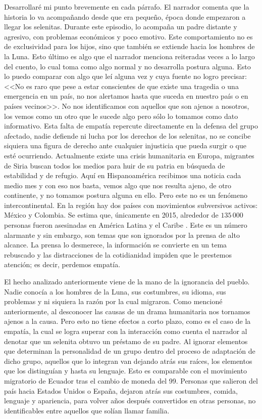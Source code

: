 \documentclass[a4paper]{tufte-handout}
\begin{document}
Desarrollaré mi punto brevemente en cada párrafo. El narrador comenta que la historia lo va acompañando desde que era pequeño, época donde empezaron a llegar los selenitas. Durante este episodio, lo acompaña un padre distante y agresivo, con problemas económicos y poco emotivo. Este comportamiento no es de exclusividad para los hijos, sino que también se extiende hacia los hombres de la Luna. Esto último es algo que el narrador menciona reiteradas veces a lo largo del cuento, lo cual toma como algo normal y no desarrolla postura alguna. Esto lo puedo comparar con algo que leí alguna vez y cuya fuente no logro precisar: <<No es raro que pese a estar conscientes de que existe una tragedia o una emergencia en un país, no nos alertamos hasta que suceda en nuestro país o en países vecinos>>. No nos identificamos con aquellos que
son ajenos a nosotros, los vemos como un otro que le sucede algo pero sólo lo tomamos como dato informativo. Esta falta de empatía repercute directamente en la defensa del grupo afectado, nadie defiende ni lucha por los derechos de los selenitas, no se concibe siquiera una figura de derecho ante cualquier injusticia que pueda surgir o que esté ocurriendo. Actualmente existe una crisis humanitaria en Europa, migrantes de Siria buscan todos los medios para huir de su patria en búsqueda de estabilidad y de refugio. Aquí en Hispanoamérica recibimos una noticia cada medio mes y con eso nos basta, vemos algo que nos resulta ajeno, de otro continente, y no tomamos postura alguna en ello. Pero este no es un fenómeno intercontinental. En la región hay dos países con movimientos subversivos activos: México y Colombia. Se estima que, únicamente en 2015, alrededor de \(135\, 000\) personas fueron asesinadas en América Latina y el Caribe \citep{Ruben}.
Este es un número alarmante y sin embargo, son temas que son ignorados por la prensa de alto alcance. La prensa lo desmerece, la información se convierte en un tema rebuscado y las distracciones de la cotidianidad impiden que le prestemos atención; es decir, perdemos empatía.

El hecho analizado anteriormente viene de la mano de la ignorancia del pueblo. Nadie conocía a los hombres de la Luna, sus costumbres, su idioma, sus problemas y ni siquiera la razón por la cual migraron. Como mencioné anteriormente, al desconocer las causas de un drama humanitaria nos tornamos ajenos a la causa. Pero esto no tiene efectos a corto plazo, como es el caso de la empatía, la cual se logra superar con la interacción como cuenta el narrador al denotar que un selenita obtuvo un préstamo de su padre. Al ignorar elementos que determinan la personalidad de un grupo dentro del proceso de adaptación de dicho grupo, aquellos que lo integran van dejando atrás sus raíces, los elementos que los distinguían y hasta su lenguaje. Esto es comparable con el movimiento migratorio de Ecuador tras el cambio de moneda del 99. Personas que salieron del país hacia Estados Unidos o España, dejaron atrás sus costumbres, comida, lenguaje y apariencia, para volver años después convertidos en otras personas, no identificables entre aquellos que solían llamar familia. 
\end{document}
